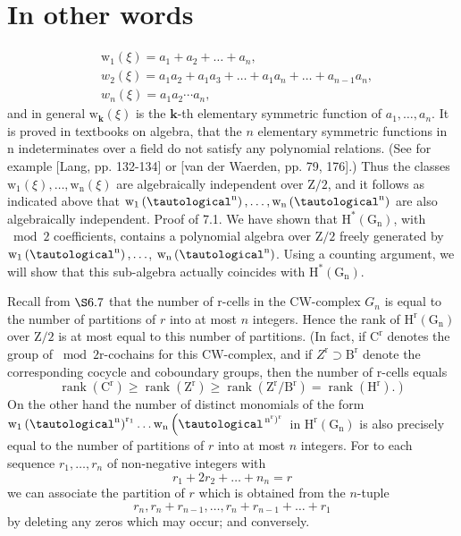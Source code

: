 \documentclass[10pt]{article}
\begin{document}
\section{In other words}
$$
\begin{aligned}
&\mathrm{w}_{1}(\xi)=a_{1}+a_{2}+\ldots+a_{n}, \\
&w_{2}(\xi)=a_{1} a_{2}+a_{1} a_{3}+\ldots+a_{1} a_{n}+\ldots+a_{n-1} a_{n}, \\
&w_{n}(\xi)=a_{1} a_{2} \cdots a_{n},
\end{aligned}
$$
and in general $\mathrm{w}_{\mathbf{k}}(\xi)$ is the $\mathbf{k}$-th elementary symmetric function of $a_{1}, \ldots, a_{n}$. It is proved in textbooks on algebra, that the $n$ elementary symmetric functions in $\mathrm{n}$ indeterminates over a field do not satisfy any polynomial relations. (See for example [Lang, pp. 132-134] or [van der Waerden, pp. 79, 176].) Thus the classes $\mathrm{w}_{1}(\xi), \ldots, \mathrm{w}_{\mathrm{n}}(\xi)$ are algebraically independent over $\mathrm{Z} / 2$, and it follows as indicated above that $\mathrm{w}_{1}\left(\tautological^{\mathrm{n}}\right), \ldots, \mathrm{w}_{\mathrm{n}}\left(\tautological^{\mathrm{n}}\right)$ are also algebraically independent. Proof of 7.1. We have shown that $\mathrm{H}^{*}\left(\mathrm{G}_{\mathrm{n}}\right)$, with $\bmod 2$ coefficients, contains a polynomial algebra over $\mathrm{Z} / 2$ freely generated by $\mathrm{w}_{1}\left(\tautological^{\mathrm{n}}\right), \ldots$, $\mathrm{w}_{\mathrm{n}}\left(\tautological^{\mathrm{n}}\right)$. Using a counting argument, we will show that this sub-algebra actually coincides with $\mathrm{H}^{*}\left(\mathrm{G}_{\mathrm{n}}\right)$.

Recall from $\S 6.7$ that the number of r-cells in the CW-complex $G_{n}$ is equal to the number of partitions of $r$ into at most $n$ integers. Hence the rank of $\mathrm{H}^{\mathrm{r}}\left(\mathrm{G}_{\mathrm{n}}\right)$ over $\mathrm{Z} / 2$ is at most equal to this number of partitions. (In fact, if $\mathrm{C}^{\mathrm{r}}$ denotes the group of $\bmod 2 \mathrm{r}$-cochains for this $\mathrm{CW}$-complex, and if $Z^{\mathrm{r}} \supset \mathrm{B}^{\mathrm{r}}$ denote the corresponding cocycle and coboundary groups, then the number of $\mathrm{r}$-cells equals
$$
\left.\operatorname{rank}\left(\mathrm{C}^{\mathrm{r}}\right) \geq \operatorname{rank}\left(\mathrm{Z}^{\mathrm{r}}\right) \geq \operatorname{rank}\left(\mathrm{Z}^{\mathrm{r}} / \mathrm{B}^{\mathrm{r}}\right)=\operatorname{rank}\left(\mathrm{H}^{\mathrm{r}}\right) .\right)
$$
On the other hand the number of distinct monomials of the form $\mathrm{w}_{1}\left(\tautological^{\mathrm{n}}\right)^{\mathrm{r}_{1}} \ldots \mathrm{w}_{\mathrm{n}}\left(\tautological^{\left.\mathrm{n}^{\mathrm{r}}\right)^{\mathrm{r}}}\right.$ in $\mathrm{H}^{\mathrm{r}}\left(\mathrm{G}_{\mathrm{n}}\right)$ is also precisely equal to the number of partitions of $r$ into at most $n$ integers. For to each sequence $r_{1}, \ldots, r_{n}$ of non-negative integers with
$$
r_{1}+2 r_{2}+\ldots+n_{n}=r
$$
we can associate the partition of $r$ which is obtained from the $n$-tuple
$$
r_{n}, r_{n}+r_{n-1}, \ldots, r_{n}+r_{n-1}+\ldots+r_{1}
$$
by deleting any zeros which may occur; and conversely.
\end{document}
